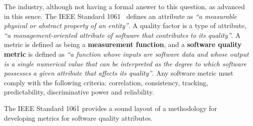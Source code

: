 \par The industry, although not having a formal answer to this question, as advanced in this sence. The IEEE Standard 1061~\cite{g1:Ieee1061:1998} defines an attribute as \emph{``a measurable physical or abstract property of an entity''}. A quality factor is a type of attribute,
\emph{``a management-oriented attribute of software that contributes to its quality''}. A metric is defined as being a {\bf measurement function}, and a {\bf software quality metric} is defined as \emph{``a function whose inputs are software data and whose output is a single numerical value that can be interpreted as the degree to which software possesses a given attribute that affects its quality''}. Any software metric must comply with the following criteria: correlation, consistency, tracking, predictability, discriminative power and reliability.
\par The IEEE Standard 1061 provides a sound layout of a methodology for developing metrics for software quality attributes.

